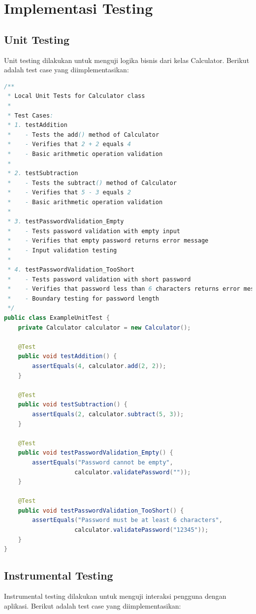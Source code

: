 \documentclass[12pt,a4paper]{article}
\begin{document}
\section{Implementasi Testing}

\subsection{Unit Testing}
Unit testing dilakukan untuk menguji logika bisnis dari kelas Calculator. Berikut adalah test case yang diimplementasikan:

\begin{lstlisting}[language=Java, caption=ExampleUnitTest.java]
/**
 * Local Unit Tests for Calculator class
 * 
 * Test Cases:
 * 1. testAddition
 *    - Tests the add() method of Calculator
 *    - Verifies that 2 + 2 equals 4
 *    - Basic arithmetic operation validation
 * 
 * 2. testSubtraction
 *    - Tests the subtract() method of Calculator
 *    - Verifies that 5 - 3 equals 2
 *    - Basic arithmetic operation validation
 * 
 * 3. testPasswordValidation_Empty
 *    - Tests password validation with empty input
 *    - Verifies that empty password returns error message
 *    - Input validation testing
 * 
 * 4. testPasswordValidation_TooShort
 *    - Tests password validation with short password
 *    - Verifies that password less than 6 characters returns error message
 *    - Boundary testing for password length
 */
public class ExampleUnitTest {
    private Calculator calculator = new Calculator();

    @Test
    public void testAddition() {
        assertEquals(4, calculator.add(2, 2));
    }

    @Test
    public void testSubtraction() {
        assertEquals(2, calculator.subtract(5, 3));
    }

    @Test
    public void testPasswordValidation_Empty() {
        assertEquals("Password cannot be empty", 
                    calculator.validatePassword(""));
    }

    @Test
    public void testPasswordValidation_TooShort() {
        assertEquals("Password must be at least 6 characters", 
                    calculator.validatePassword("12345"));
    }
}
\end{lstlisting}

\subsection{Instrumental Testing}
Instrumental testing dilakukan untuk menguji interaksi pengguna dengan aplikasi. Berikut adalah test case yang diimplementasikan:
\end{document}
